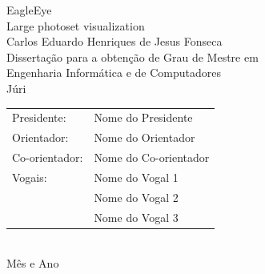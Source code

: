 \begin{center}
%
\vspace{6cm}

\vspace{0.8cm}
{\FontLb EagleEye} \\
\vspace{0.2cm}
{\FontMn Large photoset visualization } \\
\vspace{1.9cm}
{\FontMb Carlos Eduardo Henriques de Jesus Fonseca} \\
\vspace{1.9cm}
{\FontLn Disserta\c{c}\~{a}o para a obten\c{c}\~{a}o de Grau de Mestre em} \\
\vspace{0.3cm}
{\FontLb Engenharia Informática e de Computadores} \\
\vspace{1.9cm}
{\FontMb J\'{u}ri} \\
\vspace{0.3cm}
{\FontSn %
\begin{tabular}{ll}
Presidente: & Nome do Presidente \\
Orientador: & Nome do Orientador \\
Co-orientador: & Nome do Co-orientador \\
Vogais: & Nome do Vogal 1 \\
        & Nome do Vogal 2 \\
        & Nome do Vogal 3 \\
\end{tabular} } \\
\vspace{1.1cm}
{\FontMb M\^{e}s e Ano} \\
%
\end{center}

\cleardoublepage

